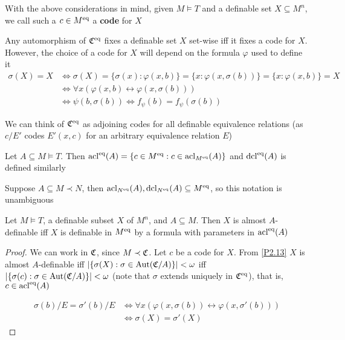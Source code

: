 \documentclass[11pt]{article}
\begin{document}
\begin{definition}[]
With the above considerations in mind, given \(M\vDash T\) and a definable set \(X\subseteq M^n\), we call
such a \(c\in M^{\operatorname{eq}}\) a \textbf{code} for \(X\)
\end{definition}

\begin{remark}
Any automorphism of \(\mathfrak{C}^{\operatorname{eq}}\) fixes a definable set \(X\) set-wise iff it fixes a code
for \(X\). However, the choice of a code for \(X\) will depend on the formula \(\varphi\) used to define
it
\begin{align*}
\sigma(X)=X&\Leftrightarrow\sigma(X)=\{\sigma(x):\varphi(x,b)\}=\{x:\varphi(x,\sigma(b))\}=\{x:\varphi(x,b)\}=X\\
&\Leftrightarrow\forall x(\varphi(x,b)\leftrightarrow\varphi(x,\sigma(b)))\\
&\Leftrightarrow\psi(b,\sigma(b))\Leftrightarrow f_\psi(b)=f_\psi(\sigma(b))
\end{align*}

We can think of \(\mathfrak{C}^{\operatorname{eq}}\) as adjoining codes for all definable equivalence relations
(as \(c/E'\) codes \(E'(x,c)\) for an arbitrary equivalence relation \(E\))
\end{remark}

\begin{definition}[]
Let \(A\subseteq M\vDash T\). Then \(\operatorname{acl}^{\operatorname{eq}}(A)=\{c\in M^{\operatorname{eq}}:c\in\operatorname{acl}_{M^{\operatorname{eq}}}(A)\}\) and \(\operatorname{dcl}^{\operatorname{eq}}(A)\)
is defined similarly
\end{definition}

\begin{remark}
Suppose \(A\subseteq M\prec N\), then \(\operatorname{acl}_{N^{\operatorname{eq}}}(A),\operatorname{dcl}_{N^{\operatorname{eq}}}(A)\subseteq M^{\operatorname{eq}}\), so this notation is unambiguous
\end{remark}

\begin{lemma}[]
\label{P2.35}
Let \(M\vDash T\), a definable subset \(X\) of \(M^n\), and \(A\subseteq M\). Then \(X\) is
almost \(A\)-definable iff \(X\) is definable in \(M^{\operatorname{eq}}\) by a formula with parameters in \(\operatorname{acl}^{\operatorname{eq}}(A)\)
\end{lemma}

\begin{proof}
We can work in \(\mathfrak{C}\), since \(M\prec\mathfrak{C}\). Let \(c\) be a code for \(X\). From \ref{P2.13} \(X\) is
almost \(A\)-definable iff \(\abs{\{\sigma(X):\sigma\in\Aut(\fC/A)\}}<\omega\) iff \(\abs{\{\sigma(c):\sigma\in\Aut(\fC/A)\}}<\omega\)
(note that \(\sigma\) extends uniquely in \(\mathfrak{C}^{\operatorname{eq}}\)),
that is, \(c\in\operatorname{acl}^{\operatorname{eq}}(A)\)

\begin{align*}
\sigma(b)/E=\sigma'(b)/E&\Leftrightarrow\forall x(\varphi(x,\sigma(b))\leftrightarrow\varphi(x,\sigma'(b)))\\
&\Leftrightarrow\sigma(X)=\sigma'(X)
\end{align*}
\end{proof}
\end{document}
